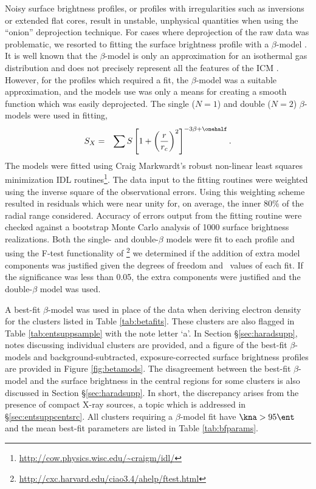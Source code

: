 Noisy surface brightness profiles, or profiles with irregularities
such as inversions or extended flat cores, result in unstable,
unphysical quantities when using the ``onion'' deprojection
technique. For cases where deprojection of the raw data was
problematic, we resorted to fitting the surface brightness profile
with a $\beta$-model \citep{1978A&A....70..677C}. It is well known
that the $\beta$-model is only an approximation for an isothermal gas
distribution and does not precisely represent all the features of the
ICM \citep{2000MNRAS.311..313E, 2002ApJ...579..571L,
  2007ApJ...665..911H}. However, for the profiles which required a
fit, the $\beta$-model was a suitable approximation, and the models
use was only a means for creating a smooth function which was easily
deprojected. The single ($N=1$) and double ($N=2$) $\beta$-models were
used in fitting,
\begin{eqnarray}
S_X &=& \displaystyle\sum S
\left[1+\left(\frac{r}{r_{c}}\right)^2\right]^{-3\beta+\onehalf}.
\end{eqnarray}
The models were fitted using Craig Markwardt's robust non-linear least
squares minimization IDL
routines\footnote{\url{http://cow.physics.wisc.edu/~craigm/idl/}}. The
data input to the fitting routines were weighted using the inverse
square of the observational errors. Using this weighting scheme
resulted in residuals which were near unity for, on average, the inner
80\% of the radial range considered. Accuracy of errors output from
the fitting routine were checked against a bootstrap Monte Carlo
analysis of 1000 surface brightness realizations. Both the single- and
double-$\beta$ models were fit to each profile and using the F-test
functionality of
\sherpa\footnote{\url{http://cxc.harvard.edu/ciao3.4/ahelp/ftest.html}}
we determined if the addition of extra model components was justified
given the degrees of freedom and \chisq\ values of each fit. If the
significance was less than 0.05, the extra components were justified
and the double-$\beta$ model was used.

A best-fit $\beta$-model was used in place of the data when deriving
electron density for the clusters listed in Table
\ref{tab:betafits}. These clusters are also flagged in Table
\ref{tab:entsuppsample} with the note letter `a'. In Section
\S\ref{sec:haradsupp}, notes discussing individual clusters are
provided, and a figure of the best-fit $\beta$-models and
background-subtracted, exposure-corrected surface brightness profiles
are provided in Figure \ref{fig:betamods}. The disagreement between
the best-fit $\beta$-model and the surface brightness in the central
regions for some clusters is also discussed in Section
\S\ref{sec:haradsupp}. In short, the discrepancy arises from the
presence of compact X-ray sources, a topic which is addressed in
\S\ref{sec:entsuppcentsrc}. All clusters requiring a $\beta$-model fit
have $\kna > 95 \ent$ and the mean best-fit parameters are listed in
Table \ref{tab:bfparams}.

